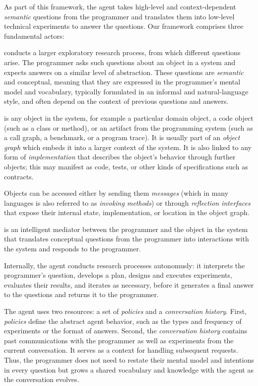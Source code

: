As part of this framework, the agent takes high-level and context-dependent \emph{semantic} questions from the programmer and translates them into low-level technical experiments to answer the questions.
Our framework comprises three fundamental actors:

\begin{description}[noextralabelsep]
	\item[The programmer] conducts a larger exploratory research process, from which different questions arise.
	The programmer asks such questions about an object in a system and expects answers on a similar level of abstraction.
	These questions are \emph{semantic} and conceptual, meaning that they are expressed in the programmer's mental model and vocabulary, typically formulated in an informal and natural-language style, and often depend on the context of previous questions and answers.

	\item[The object] is any object in the system, for example a particular domain object, a code object (such as a class or method), or an artifact from the programming system (such as a call graph, a benchmark, or a program trace).
	It is usually part of an \emph{object graph} which embeds it into a larger context of the system.
	It is also linked to any form of \emph{implementation} that describes the object's behavior through further objects; this may manifest as code, tests, or other kinds of specifications such as contracts.

	Objects can be accessed either by sending them \emph{messages} (which in many languages is also referred to as \emph{invoking methods}) or through \emph{reflection interfaces} that expose their internal state, implementation, or location in the object graph.

	\item[The exploratory programming agent] is an intelligent mediator between the programmer and the object in the system that translates conceptual questions from the programmer into interactions with the system and responds to the programmer.

	Internally, the agent conducts research processes autonomusly: it interprets the programmer's question, develops a plan, designs and executes experiments, evaluates their results, and iterates as necessary, before it generates a final answer to the questions and returns it to the programmer.

	The agent uses two resources: a set of \emph{policies} and a \emph{conversation history}.
	First, \emph{policies} define the abstract agent behavior, such as the types and frequency of experiments or the format of answers.
	Second, the \emph{conversation history} contains past communications with the programmer as well as experiments from the current conversation.
	It serves as a context for handling subsequent requests.
	Thus, the programmer does not need to restate their mental model and intentions in every question but grows a shared vocabulary and knowledge with the agent as the conversation evolves.
\end{description}

